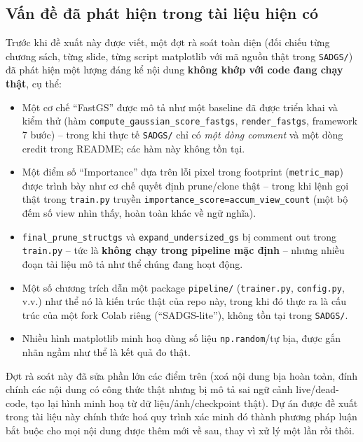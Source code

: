 \documentclass[a4paper,11pt]{article}
\begin{document}
\subsection{Vấn đề đã phát hiện trong tài liệu hiện có}
Trước khi đề xuất này được viết, một đợt rà soát toàn diện (đối chiếu từng chương sách, từng
slide, từng script matplotlib với mã nguồn thật trong \texttt{SADGS/}) đã phát hiện một lượng
đáng kể nội dung \textbf{không khớp với code đang chạy thật}, cụ thể:
\begin{itemize}[leftmargin=1.2em]
    \item Một cơ chế ``FastGS'' được mô tả như một baseline đã được triển khai và kiểm thử
    (hàm \texttt{compute\_gaussian\_score\_fastgs}, \texttt{render\_fastgs}, framework 7 bước)
    -- trong khi thực tế \texttt{SADGS/} chỉ có \emph{một dòng comment} và một dòng credit
    trong README; các hàm này không tồn tại.
    \item Một điểm số ``Importance'' dựa trên lỗi pixel trong footprint (\texttt{metric\_map})
    được trình bày như cơ chế quyết định prune/clone thật -- trong khi lệnh gọi thật trong
    \texttt{train.py} truyền \texttt{importance\_score=accum\_view\_count} (một bộ đếm số
    view nhìn thấy, hoàn toàn khác về ngữ nghĩa).
    \item \texttt{final\_prune\_structgs} và \texttt{expand\_undersized\_gs} bị comment out
    trong \texttt{train.py} -- tức là \textbf{không chạy trong pipeline mặc định} -- nhưng
    nhiều đoạn tài liệu mô tả như thể chúng đang hoạt động.
    \item Một số chương trích dẫn một package \texttt{pipeline/} (\texttt{trainer.py},
    \texttt{config.py}, v.v.) như thể nó là kiến trúc thật của repo này, trong khi đó thực ra
    là cấu trúc của một fork Colab riêng (``SADGS-lite''), không tồn tại trong
    \texttt{SADGS/}.
    \item Nhiều hình matplotlib minh hoạ dùng số liệu \texttt{np.random}/tự bịa, được gắn nhãn
    ngầm như thể là kết quả đo thật.
\end{itemize}

\begin{luuy}
Đợt rà soát này đã sửa phần lớn các điểm trên (xoá nội dung bịa hoàn toàn, đính chính các nội
dung có công thức thật nhưng bị mô tả sai ngữ cảnh live/dead-code, tạo lại hình minh hoạ từ dữ
liệu/ảnh/checkpoint thật). Dự án được đề xuất trong tài liệu này chính thức hoá quy trình xác
minh đó thành phương pháp luận bắt buộc cho mọi nội dung được thêm mới về sau, thay vì xử lý
một lần rồi thôi.
\end{luuy}
\end{document}
